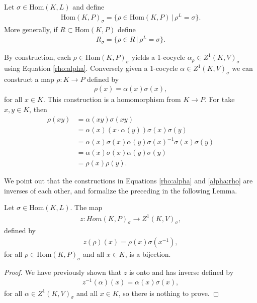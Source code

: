 \begin{definition} Let $\sigma \in \mathrm{Hom}(K, L)$ and define
\begin{align*} \mathrm{Hom}(K, P)_\sigma = \{ \rho \in \mathrm{Hom}(K, P) \,|\, \rho^L = \sigma\}. \end{align*}
More generally, if $R \subset \mathrm{Hom}(K, P)$ define
\begin{align*} R_\sigma = \{ \rho \in R \,|\, \rho^L = \sigma \}. \end{align*}
\end{definition}

By construction, each $\rho \in \mathrm{Hom}(K, P)_\sigma$ yields a 1-cocycle $\alpha_\rho \in Z^1(K, V)_\sigma$ using Equation \ref{rho:alpha}.
Conversely given a 1-cocycle $\alpha \in Z^1(K, V)_\sigma$ we can construct a map $\rho: K \rightarrow P$ defined by
\begin{align}\label{alpha:rho}
\rho(x) = \alpha(x)\sigma(x),
\end{align}
for all $x \in K$. This construction is a homomorphism from $K \rightarrow P$. For take $x, y \in K$, then
\begin{align*}
  \rho(x y) &= \alpha(x y) \sigma(x y) \\
  &= \alpha(x)(x \cdot \alpha(y)) \sigma(x) \sigma(y) \\
  &= \alpha(x) \sigma(x) \alpha(y) \sigma(x)^{-1} \sigma(x) \sigma(y) \\
  &= \alpha(x) \sigma(x) \alpha(y) \sigma(y) \\
  &= \rho(x) \rho(y).
\end{align*}

We point out that the constructions in Equations \ref{rho:alpha} and \ref{alpha:rho} are inverses of each other, and formalize the preceding in the following Lemma.

\begin{lemma}
  Let $\sigma \in \mathrm{Hom}(K, L)$. The map
\begin{align*} z: Hom(K, P)_{\sigma} \rightarrow Z^1(K, V)_\sigma, \end{align*}
defined by
\begin{align*} z(\rho)(x) = \rho(x)\sigma(x^{-1}), \end{align*}
for all $\rho \in \mathrm{Hom}(K, P)_\sigma$ and all $x \in K$, is a bijection.
\label{lem:hom_z1}
\end{lemma}
\begin{proof}
We have previously shown that $z$ is onto and has inverse defined by
\begin{align*} z^{-1}(\alpha)(x) = \alpha(x)\sigma(x), \end{align*}
for all $\alpha \in Z^1(K, V)_\sigma$ and all $x \in K$, so there is nothing to prove.
\end{proof}

